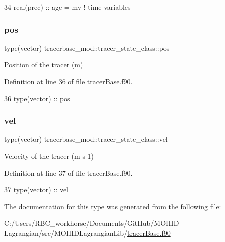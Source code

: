 \begin{DoxyCode}
34         \textcolor{keywordtype}{real(prec)} :: age = mv             \textcolor{comment}{! time variables}
\end{DoxyCode}
\mbox{\label{structtracerbase__mod_1_1tracer__state__class_a184b3ecbe519a6cc7468fa3060131ce0}} 
\subsubsection{\texorpdfstring{pos}{pos}}
{\footnotesize\ttfamily type(vector) tracerbase\+\_\+mod\+::tracer\+\_\+state\+\_\+class\+::pos\hspace{0.3cm}{\ttfamily [private]}}



Position of the tracer (m) 



Definition at line 36 of file tracer\+Base.\+f90.


\begin{DoxyCode}
36         \textcolor{keywordtype}{type}(vector) :: pos
\end{DoxyCode}
\mbox{\label{structtracerbase__mod_1_1tracer__state__class_ae94928588f703077bae9de12c8e9d14b}} 
\subsubsection{\texorpdfstring{vel}{vel}}
{\footnotesize\ttfamily type(vector) tracerbase\+\_\+mod\+::tracer\+\_\+state\+\_\+class\+::vel\hspace{0.3cm}{\ttfamily [private]}}



Velocity of the tracer (m s-\/1) 



Definition at line 37 of file tracer\+Base.\+f90.


\begin{DoxyCode}
37         \textcolor{keywordtype}{type}(vector) :: vel
\end{DoxyCode}


The documentation for this type was generated from the following file\+:\begin{DoxyCompactItemize}
\item 
C\+:/\+Users/\+R\+B\+C\+\_\+workhorse/\+Documents/\+Git\+Hub/\+M\+O\+H\+I\+D-\/\+Lagrangian/src/\+M\+O\+H\+I\+D\+Lagrangian\+Lib/\mbox{\hyperlink{tracer_base_8f90}{tracer\+Base.\+f90}}\end{DoxyCompactItemize}
